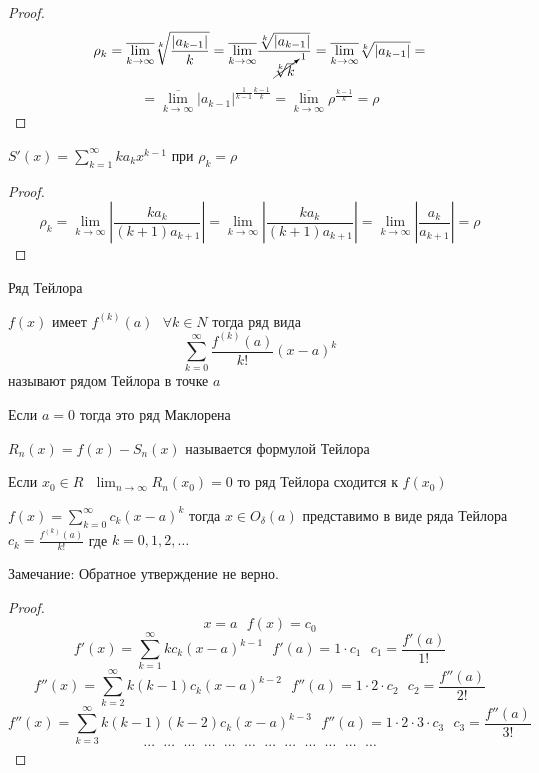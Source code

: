 \begin{proof}
  $$
  \rho_k = \overline{\lim_{k \to \infty}} \sqrt[k]{\frac{|a_{k-1}|}{k}} =
  \overline{\lim_{k \to \infty}} \frac{\sqrt[k]{|a_{k-1}|}}{
  \cancelto{1}{\sqrt[k]{k}}} =
  \overline{\lim_{k \to \infty}} \sqrt[k]{|a_{k-1}|} =
  $$
  $$
  = \overline{\lim_{k \to \infty}} |a_{k-1}|^{\frac{1}{k-1}\frac{k-1}{k}} =
  \overline{\lim_{k \to \infty}} \rho^{\frac{k-1}{k}} = \rho
  $$
\end{proof}

\begin{block}[Следствие 3]
  $S'(x) = \sum_{k=1}^{\infty}k a_k x^{k-1}$ при $\rho_k = \rho$
\end{block}

\begin{proof}
  $$
  \rho_k = \lim_{k \to \infty} \left| \frac{k a_k}{(k+1)a_{k+1}} \right| =
  \lim_{k \to \infty} \left| \frac{k a_k}{(k+1)a_{k+1}} \right| =
  \lim_{k \to \infty} \left| \frac{a_k}{a_{k+1}} \right| = \rho
  $$
\end{proof}

\begin{title}[\Large]
  Ряд Тейлора
\end{title}

\begin{define}
  $f(x)$ имеет $f^{(k)}(a) ~~~ \forall k \in N$ тогда ряд вида
  $$
  \sum_{k=0}^{\infty} \frac{f^{(k)}(a)}{k!} (x-a)^k
  $$
  называют рядом Тейлора в точке $a$

  Если $a = 0$ тогда это ряд Маклорена

  $R_n(x) = f(x) - S_n(x)$ называется формулой Тейлора

  Если $x_0 \in R ~~~ \lim_{n \to \infty} R_n(x_0) = 0$ то ряд Тейлора сходится
  к $f(x_0)$
\end{define}

\begin{theorem}
  $f(x) = \sum_{k=0}^{\infty} c_k(x-a)^k$ тогда $x \in O_{\delta}(a)$
  представимо в виде ряда Тейлора
  $c_k = \frac{f^{(k)}(a)}{k!}$ где $k = 0,1,2, \ldots$

  Замечание: Обратное утверждение не верно.
\end{theorem}

\begin{proof}
  $$
  x = a ~~~ f(x) = c_0
  $$
  $$
  f'(x) = \sum_{k=1}^{\infty} k c_k(x - a)^{k - 1} ~~~ f'(a) = 1 \cdot c_1 ~~~
  c_1 = \frac{f'(a)}{1!}
  $$
  $$
  f''(x) = \sum_{k=2}^{\infty} k(k-1) c_k (x - a)^{k-2} ~~~
  f''(a) = 1 \cdot 2 \cdot c_2 ~~~ c_2 = \frac{f''(a)}{2!}
  $$
  $$
  f''(x) = \sum_{k=3}^{\infty} k(k-1)(k-2) c_k (x - a)^{k-3} ~~~
  f''(a) = 1 \cdot 2 \cdot 3 \cdot c_3 ~~~ c_3 = \frac{f''(a)}{3!}
  $$
  $$
  \cdots ~~~ \cdots ~~~ \cdots ~~~ \cdots ~~~ \cdots ~~~ \cdots
  ~~~ \cdots ~~~ \cdots ~~~ \cdots ~~~ \cdots ~~~ \cdots ~~~ \cdots
  $$
\end{proof}

